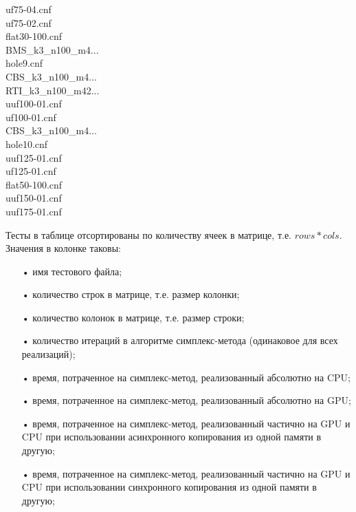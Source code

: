 \documentclass[a4paper,14pt,russian]{extreport}
\begin{document}
\begin{tabbing}
  uf75-04.cnf							 \\
  uf75-02.cnf							 \\
  flat30-100.cnf							 \\
  BMS\_k3\_n100\_m4...							 \\
  hole9.cnf							 \\
  CBS\_k3\_n100\_m4...							 \\
  RTI\_k3\_n100\_m42...							 \\
  uuf100-01.cnf							 \\
  uf100-01.cnf							 \\
  CBS\_k3\_n100\_m4...							 \\
  hole10.cnf							 \\
  uuf125-01.cnf							 \\
  uf125-01.cnf							 \\
  flat50-100.cnf							 \\
  uuf150-01.cnf							 \\
  uuf175-01.cnf							
  \end{tabbing}
\par Тесты в таблице отсортированы по количеству ячеек в матрице, т.е. $rows * cols$. Значения в колонке таковы: 
  \begin{itemize}
  \item[•] имя тестового файла;
  \item[•] количество строк в матрице, т.е. размер колонки;
  \item[•] количество колонок в матрице, т.е. размер строки;
  \item[•] количество итераций в алгоритме симплекс-метода (одинаковое для всех реализаций);
  \item[•] время, потраченное на симплекс-метод, реализованный абсолютно на CPU;
  \item[•] время, потраченное на симплекс-метод, реализованный абсолютно на GPU;
  \item[•] время, потраченное на симплекс-метод, реализованный частично на GPU и CPU при использовании асинхронного копирования из одной памяти в другую;
  \item[•] время, потраченное на симплекс-метод, реализованный частично на GPU и CPU при использовании синхронного копирования из одной памяти в другую;
  \end{itemize}
\end{document}
